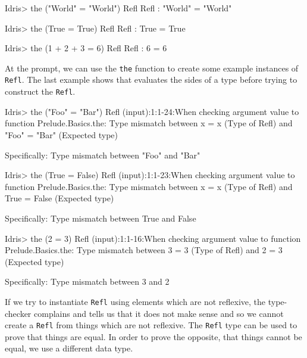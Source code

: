     \begin{code}[label={des:refl-egs}, caption={Examples of reflexivity}]
            Idris> the ("World" = "World") Refl
            Refl : "World" = "World"
            
            
            Idris> the (True = True) Refl
            Refl : True = True
            
            
            Idris> the (1 + 2 + 3 = 6) Refl
            Refl : 6 = 6
    \end{code}
    At the \Idris prompt, we can use the \texttt{the} function to create some example instances of \texttt{Refl}. The last example shows that \Idris evaluates the sides of a type before trying to construct the \texttt{Refl}.
        
    \newpage
        
    \begin{code}[label={des:not-refl}, caption={Things that are not reflexive}, escapeinside={(*}{*)}]
    Idris> the ("Foo" = "Bar") Refl
    (input):1:1-24:When checking argument value to function
    Prelude.Basics.the:
        Type mismatch between
            x = x (Type of Refl)
        and
            "Foo" = "Bar" (Expected type)
    
        Specifically:
            Type mismatch between
                "Foo"
            and
                "Bar"
    
    Idris> the (True = False) Refl
    (input):1:1-23:When checking argument value to function
    Prelude.Basics.the:
        Type mismatch between
            x = x (Type of Refl)
        and
            True = False (Expected type)
    
        Specifically:
            Type mismatch between
                True
            and
                False
    
    
    Idris> the (2 = 3) Refl
    (input):1:1-16:When checking argument value to function
    Prelude.Basics.the:
        Type mismatch between
            3 = 3 (Type of Refl)
        and
            2 = 3 (Expected type)
        
        Specifically:
            Type mismatch between
                3
            and
                2
    \end{code}
    If we try to instantiate \texttt{Refl} using elements which are not reflexive, the type-checker complains and tells us that it does not make sense and so we cannot create a \texttt{Refl} from things which are not reflexive. The \texttt{Refl} type can be used to prove that things are equal. In order to prove the opposite, that things cannot be equal, we use a different data type.

